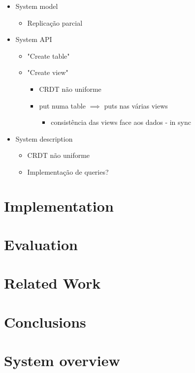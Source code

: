 \documentclass{vldb}
\begin{document}
\begin{itemize}
	\item System model
	\begin{itemize}
		\item Replicação parcial
	\end{itemize}
	\item System API
	\begin{itemize}
		\item "Create table"
		\item "Create view"
		\begin{itemize}
			\item CRDT não uniforme
			\item put numa table $\implies$ puts nas várias views
			\begin{itemize}
				\item consistência das views face aos dados - in sync
			\end{itemize}
		\end{itemize}
	\end{itemize}
	\item System description
	\begin{itemize}
		\item CRDT não uniforme
		\item Implementação de queries?
	\end{itemize}

\end{itemize}

\section{Implementation}

\section{Evaluation}

\section{Related Work}

\section{Conclusions}





\section{System overview}
\end{document}
